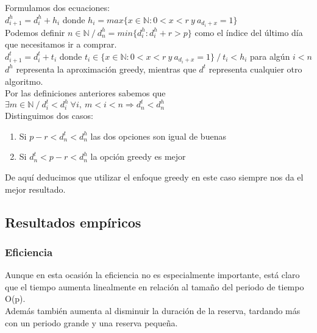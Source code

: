 Formulamos dos ecuaciones:\\

$d_{i+1}^h = d_i^h + h_i$ donde $h_i = max\{x \in \mathbb{N} : 0<x<r\ y\ a_{d_i+x} = 1\}$\\
Podemos definir $n \in \mathbb{N}\ /\ d_n^h = min\{d_i^h: d_i^h + r > p\}$ como el índice del último día que necesitamos ir a comprar.\\

$d_{i+1}^t = d_i^t + t_i$ donde $t_i \in \{x \in \mathbb{N} : 0<x<r\ y\ a_{d_i+x} = 1\}\ /\ t_i < h_i$ para algún $i<n$\\

$d^{h}$ representa la aproximación greedy, mientras que $d^{t}$ representa cualquier otro algoritmo.\\

Por las definiciones anteriores sabemos que $\exists m \in \mathbb{N}\ /\ d_i^{t} < d_i^{h}\ \forall i,\ m<i<n \Rightarrow d_n^{t} < d_n^{h}$\\
Distinguimos dos casos:\\
\begin{enumerate}
\item Si $p-r < d_n^{t} < d_n^{h}$ las dos opciones son igual de buenas\\
\item Si $d_n^{t} < p-r < d_n^{h}$ la opción greedy es mejor\\
\end{enumerate}

De aquí deducimos que utilizar el enfoque greedy en este caso siempre nos da el mejor resultado.\\



\subsection{Resultados empíricos}
\subsubsection{Eficiencia}

Aunque en esta ocasión la eficiencia no es especialmente importante, está claro que el tiempo aumenta linealmente en relación al tamaño del periodo de tiempo O(p).\\

Además también aumenta al disminuir la duración de la reserva, tardando más con un periodo grande y una reserva pequeña.\\

